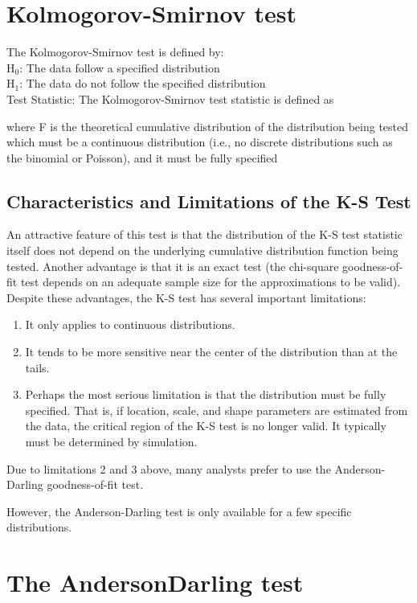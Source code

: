 


\section{Kolmogorov-Smirnov test}
 The Kolmogorov-Smirnov test is defined by:
\\
H$_0$:     The data follow a specified distribution\\
H$_1$:     The data do not follow the specified distribution\\

Test Statistic:     The Kolmogorov-Smirnov test statistic is defined as

where F is the theoretical cumulative distribution of the distribution being tested which must be a continuous distribution (i.e., no discrete distributions such as the binomial or Poisson), and it must be fully specified

\subsection{ Characteristics and Limitations of the K-S Test}


An attractive feature of this test is that the distribution of the K-S test statistic itself does not depend on the underlying cumulative distribution function being tested. Another advantage is that it is an exact test (the chi-square goodness-of-fit test depends on an adequate sample size for the approximations to be valid). Despite these advantages, the K-S test has several important limitations:
\begin{enumerate}
\item It only applies to continuous distributions.
\item It tends to be more sensitive near the center of the distribution than at the tails.
\item Perhaps the most serious limitation is that the distribution must be fully specified. That is, if location, scale, and shape parameters are estimated from the data, the critical region of the K-S test is no longer valid. It typically must be determined by simulation.
\end{enumerate}
Due to limitations 2 and 3 above, many analysts prefer to use the Anderson-Darling goodness-of-fit test.

However, the Anderson-Darling test is only available for a few specific distributions.

\section{The AndersonDarling test}

